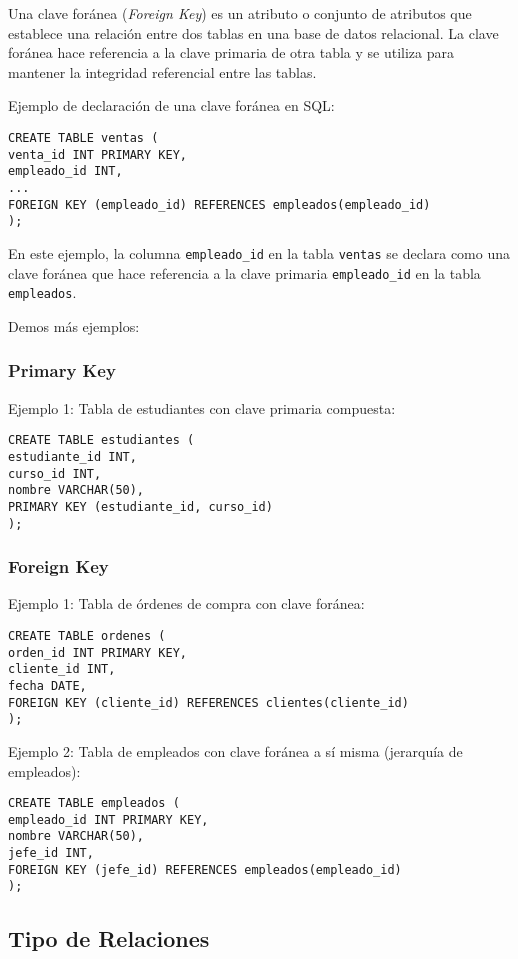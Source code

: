 \documentclass[executivepaper]{article}
\begin{document}
Una clave foránea (\textit{Foreign Key}) es un atributo o conjunto de atributos que establece una relación entre dos tablas en una base de datos relacional. La clave foránea hace referencia a la clave primaria de otra tabla y se utiliza para mantener la integridad referencial entre las tablas.

Ejemplo de declaración de una clave foránea en SQL:

\begin{lstlisting}
CREATE TABLE ventas (
venta_id INT PRIMARY KEY,
empleado_id INT,
...
FOREIGN KEY (empleado_id) REFERENCES empleados(empleado_id)
);
\end{lstlisting}

En este ejemplo, la columna \texttt{empleado\_id} en la tabla \texttt{ventas} se declara como una clave foránea que hace referencia a la clave primaria \texttt{empleado\_id} en la tabla \texttt{empleados}.

Demos más ejemplos:

\subsubsection*{Primary Key}

Ejemplo 1: Tabla de estudiantes con clave primaria compuesta:
\begin{lstlisting}
CREATE TABLE estudiantes (
estudiante_id INT,
curso_id INT,
nombre VARCHAR(50),
PRIMARY KEY (estudiante_id, curso_id)
);
\end{lstlisting}

\subsubsection*{Foreign Key}

Ejemplo 1: Tabla de órdenes de compra con clave foránea:
\begin{lstlisting}
CREATE TABLE ordenes (
orden_id INT PRIMARY KEY,
cliente_id INT,
fecha DATE,
FOREIGN KEY (cliente_id) REFERENCES clientes(cliente_id)
);
\end{lstlisting}

Ejemplo 2: Tabla de empleados con clave foránea a sí misma (jerarquía de empleados):
\begin{lstlisting}
CREATE TABLE empleados (
empleado_id INT PRIMARY KEY,
nombre VARCHAR(50),
jefe_id INT,
FOREIGN KEY (jefe_id) REFERENCES empleados(empleado_id)
);
\end{lstlisting}

\subsection{Tipo de Relaciones}
\end{document}
